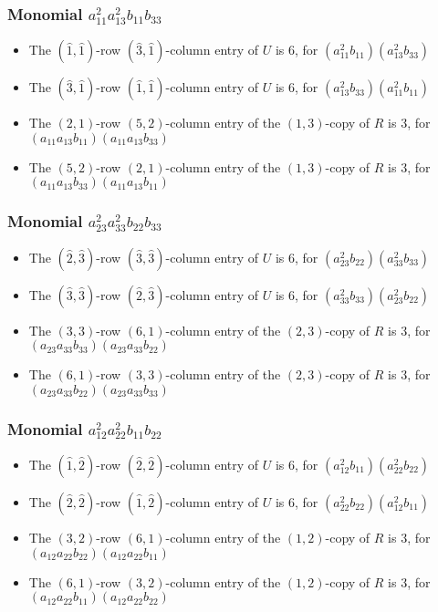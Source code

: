 \documentclass{article}
\begin{document}
\subsubsection{Monomial $ a_{11}^{2} a_{13}^{2} b_{11} b_{33} $}

\begin{itemize}
\item The $(\hat{1}, \hat{1})$-row $(\hat{3}, \hat{1})$-column entry of $U$ is $6$, for $( a_{11}^{2} b_{11} )( a_{13}^{2} b_{33} )$ 
\item The $(\hat{3}, \hat{1})$-row $(\hat{1}, \hat{1})$-column entry of $U$ is $6$, for $( a_{13}^{2} b_{33} )( a_{11}^{2} b_{11} )$ 
\item The $(2, 1)$-row $(5, 2)$-column entry of the $ \left(1, 3\right) $-copy of $R$ is $ 3 $, for $( a_{11} a_{13} b_{11} )( a_{11} a_{13} b_{33} )$ 
\item The $(5, 2)$-row $(2, 1)$-column entry of the $ \left(1, 3\right) $-copy of $R$ is $ 3 $, for $( a_{11} a_{13} b_{33} )( a_{11} a_{13} b_{11} )$ 
\end{itemize}
\subsubsection{Monomial $ a_{23}^{2} a_{33}^{2} b_{22} b_{33} $}

\begin{itemize}
\item The $(\hat{2}, \hat{3})$-row $(\hat{3}, \hat{3})$-column entry of $U$ is $6$, for $( a_{23}^{2} b_{22} )( a_{33}^{2} b_{33} )$ 
\item The $(\hat{3}, \hat{3})$-row $(\hat{2}, \hat{3})$-column entry of $U$ is $6$, for $( a_{33}^{2} b_{33} )( a_{23}^{2} b_{22} )$ 
\item The $(3, 3)$-row $(6, 1)$-column entry of the $ \left(2, 3\right) $-copy of $R$ is $ 3 $, for $( a_{23} a_{33} b_{33} )( a_{23} a_{33} b_{22} )$ 
\item The $(6, 1)$-row $(3, 3)$-column entry of the $ \left(2, 3\right) $-copy of $R$ is $ 3 $, for $( a_{23} a_{33} b_{22} )( a_{23} a_{33} b_{33} )$ 
\end{itemize}
\subsubsection{Monomial $ a_{12}^{2} a_{22}^{2} b_{11} b_{22} $}

\begin{itemize}
\item The $(\hat{1}, \hat{2})$-row $(\hat{2}, \hat{2})$-column entry of $U$ is $6$, for $( a_{12}^{2} b_{11} )( a_{22}^{2} b_{22} )$ 
\item The $(\hat{2}, \hat{2})$-row $(\hat{1}, \hat{2})$-column entry of $U$ is $6$, for $( a_{22}^{2} b_{22} )( a_{12}^{2} b_{11} )$ 
\item The $(3, 2)$-row $(6, 1)$-column entry of the $ \left(1, 2\right) $-copy of $R$ is $ 3 $, for $( a_{12} a_{22} b_{22} )( a_{12} a_{22} b_{11} )$ 
\item The $(6, 1)$-row $(3, 2)$-column entry of the $ \left(1, 2\right) $-copy of $R$ is $ 3 $, for $( a_{12} a_{22} b_{11} )( a_{12} a_{22} b_{22} )$ 
\end{itemize}
\end{document}
